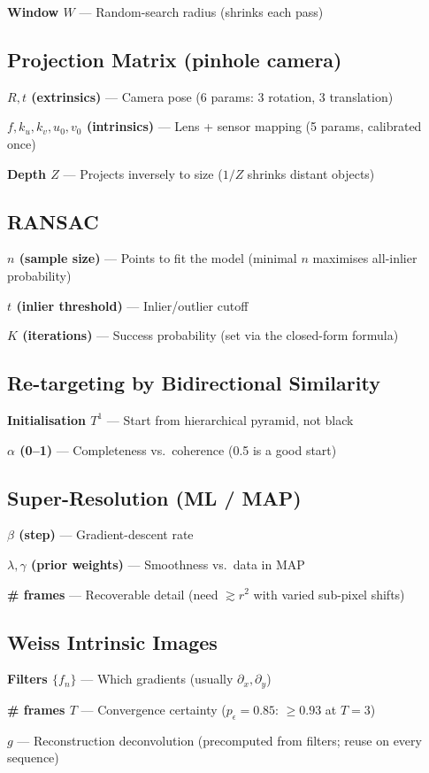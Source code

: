 \documentclass[10pt]{article}
\begin{document}
\textbf{Window $W$} --- Random-search radius (shrinks each pass)

\subsection*{Projection Matrix (pinhole camera)}
\textbf{$R,t$ (extrinsics)} --- Camera pose (6 params: 3 rotation, 3 translation)

\textbf{$f,k_u,k_v,u_0,v_0$ (intrinsics)} --- Lens + sensor mapping (5 params, calibrated once)

\textbf{Depth $Z$} --- Projects inversely to size ($1/Z$ shrinks distant objects)

\subsection*{RANSAC}
\textbf{$n$ (sample size)} --- Points to fit the model (minimal $n$ maximises all-inlier probability)

\textbf{$t$ (inlier threshold)} --- Inlier/outlier cutoff

\textbf{$K$ (iterations)} --- Success probability (set via the closed-form formula)

\subsection*{Re-targeting by Bidirectional Similarity}
\textbf{Initialisation $T^1$} --- Start from hierarchical pyramid, not black

\textbf{$\alpha$ (0--1)} --- Completeness vs.\ coherence (0.5 is a good start)

\subsection*{Super-Resolution (ML / MAP)}
\textbf{$\beta$ (step)} --- Gradient-descent rate

\textbf{$\lambda,\gamma$ (prior weights)} --- Smoothness vs.\ data in MAP

\textbf{\# frames} --- Recoverable detail (need $\gtrsim r^2$ with varied sub-pixel shifts)

\subsection*{Weiss Intrinsic Images}
\textbf{Filters $\{f_n\}$} --- Which gradients (usually $\partial_x,\partial_y$)

\textbf{\# frames $T$} --- Convergence certainty ($p_\epsilon=0.85$: $\ge0.93$ at $T=3$)

\textbf{$g$} --- Reconstruction deconvolution (precomputed from filters; reuse on every sequence)
\end{document}
